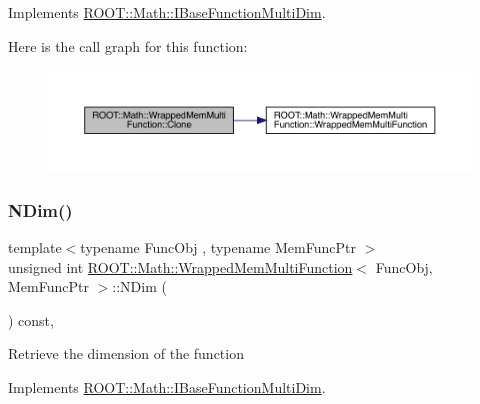 Implements \mbox{\hyperlink{classROOT_1_1Math_1_1IBaseFunctionMultiDim_a57939204b1f525b43835b42e0635dd3b}{R\+O\+O\+T\+::\+Math\+::\+I\+Base\+Function\+Multi\+Dim}}.

Here is the call graph for this function\+:
\nopagebreak
\begin{figure}[H]
\begin{center}
\leavevmode
\includegraphics[width=350pt]{d3/dd9/classROOT_1_1Math_1_1WrappedMemMultiFunction_ab9f49fc9a151e8d921dbe9cb148c1fc8_cgraph}
\end{center}
\end{figure}
\mbox{\label{classROOT_1_1Math_1_1WrappedMemMultiFunction_ae9aaf3de1f2e1e6e1c1310fccdb06009}} 
\subsubsection{\texorpdfstring{NDim()}{NDim()}\hspace{0.1cm}{\footnotesize\ttfamily [1/2]}}
{\footnotesize\ttfamily template$<$typename Func\+Obj , typename Mem\+Func\+Ptr $>$ \\
unsigned int \mbox{\hyperlink{classROOT_1_1Math_1_1WrappedMemMultiFunction}{R\+O\+O\+T\+::\+Math\+::\+Wrapped\+Mem\+Multi\+Function}}$<$ Func\+Obj, Mem\+Func\+Ptr $>$\+::N\+Dim (\begin{DoxyParamCaption}{ }\end{DoxyParamCaption}) const\hspace{0.3cm}{\ttfamily [inline]}, {\ttfamily [virtual]}}

Retrieve the dimension of the function 

Implements \mbox{\hyperlink{classROOT_1_1Math_1_1IBaseFunctionMultiDim_a16f37dc7a6d00c75ddeda0697741315d}{R\+O\+O\+T\+::\+Math\+::\+I\+Base\+Function\+Multi\+Dim}}.

\mbox{\label{classROOT_1_1Math_1_1WrappedMemMultiFunction_ae9aaf3de1f2e1e6e1c1310fccdb06009}} 
